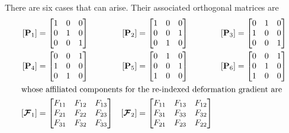 There are six cases that can arise.  Their associated orthogonal matrices are
\begin{subequations}
    \begin{align}
    [ \mathbf{P}_1 ] & = \begin{bmatrix}
    1 & 0 & 0\\
    0 & 1 & 0\\
    0 & 0 & 1
    \end{bmatrix} & 
    [ \mathbf{P}_2 ] & = \begin{bmatrix}
    1 & 0 & 0\\
    0 & 0 & 1\\
    0 & 1 & 0
    \end{bmatrix} &
    [ \mathbf{P}_3 ] & = \begin{bmatrix}
    0 & 1 & 0\\
    1 & 0 & 0\\
    0 & 0 & 1
    \end{bmatrix} \notag \\
    [ \mathbf{P}_4 ] & = 
    \begin{bmatrix}
    0 & 0 & 1\\
    1 & 0 & 0\\
    0 & 1 & 0
    \end{bmatrix} & 
    [ \mathbf{P}_5 ] & = \begin{bmatrix}
    0 & 1 & 0\\
    0 & 0 & 1\\
    1 & 0 & 0
    \end{bmatrix} &
    [ \mathbf{P}_6 ] & = \begin{bmatrix}
    0 & 0 & 1\\
    0 & 1 & 0\\
    1 & 0 & 0
    \end{bmatrix} \\
    \intertext{whose affiliated components for the re-indexed deformation gradient are}
    [ \boldsymbol{\mathcal{F}}_1 ] & = \begin{bmatrix}
    F_{11} & F_{12} & F_{13}\\
    F_{21} & F_{22} & F_{23}\\
    F_{31} & F_{32} & F_{33}
    \end{bmatrix} & 
    [ \boldsymbol{\mathcal{F}}_2 ] & = \begin{bmatrix}
    F_{11} & F_{13} & F_{12}\\
    F_{31} & F_{33} & F_{32}\\
    F_{21} & F_{23} & F_{22}
    \end{bmatrix} &

\end{align}
\end{subequations}
